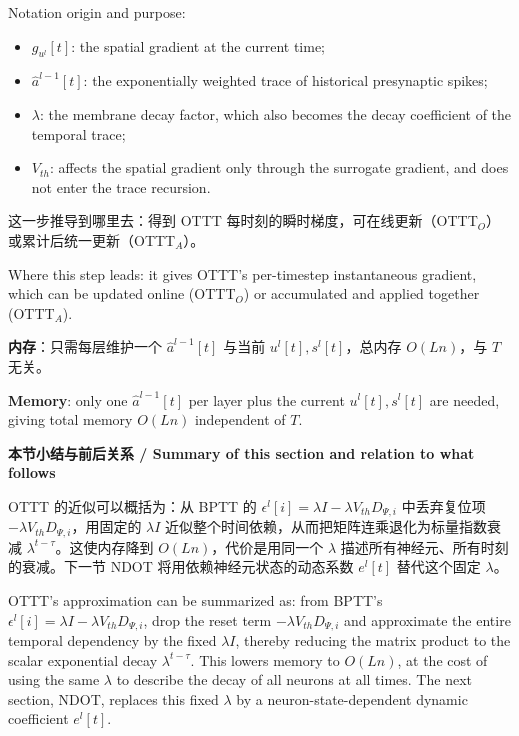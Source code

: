 \documentclass[journal,12pt,onecolumn]{IEEEtran}
\begin{document}
Notation origin and purpose:
\begin{itemize}[leftmargin=1.5em,itemsep=2pt]
\item $g_{u^l}[t]$: the spatial gradient at the current time;
\item $\hat{a}^{l-1}[t]$: the exponentially weighted trace of historical presynaptic spikes;
\item $\lambda$: the membrane decay factor, which also becomes the decay coefficient of the temporal trace;
\item $V_{th}$: affects the spatial gradient only through the surrogate gradient, and does not enter the trace recursion.
\end{itemize}

这一步推导到哪里去：得到 OTTT 每时刻的瞬时梯度，可在线更新（OTTT$_O$）或累计后统一更新（OTTT$_A$）。

Where this step leads: it gives OTTT's per-timestep instantaneous gradient, which can be updated online (OTTT$_O$) or accumulated and applied together (OTTT$_A$).

\textbf{内存}：只需每层维护一个 $\hat{a}^{l-1}[t]$ 与当前 $u^l[t],s^l[t]$，总内存 $O(Ln)$，与 $T$ 无关。

\textbf{Memory}: only one $\hat{a}^{l-1}[t]$ per layer plus the current $u^l[t],s^l[t]$ are needed, giving total memory $O(Ln)$ independent of $T$.

\medskip\noindent\textbf{本节小结与前后关系 / Summary of this section and relation to what follows}

OTTT 的近似可以概括为：从 BPTT 的 $\epsilon^l[i]=\lambda I-\lambda V_{th}D_{\Psi,i}$ 中丢弃复位项 $-\lambda V_{th}D_{\Psi,i}$，用固定的 $\lambda I$ 近似整个时间依赖，从而把矩阵连乘退化为标量指数衰减 $\lambda^{t-\tau}$。这使内存降到 $O(Ln)$，代价是用同一个 $\lambda$ 描述所有神经元、所有时刻的衰减。下一节 NDOT 将用依赖神经元状态的动态系数 $e^l[t]$ 替代这个固定 $\lambda$。

OTTT's approximation can be summarized as: from BPTT's $\epsilon^l[i]=\lambda I-\lambda V_{th}D_{\Psi,i}$, drop the reset term $-\lambda V_{th}D_{\Psi,i}$ and approximate the entire temporal dependency by the fixed $\lambda I$, thereby reducing the matrix product to the scalar exponential decay $\lambda^{t-\tau}$. This lowers memory to $O(Ln)$, at the cost of using the same $\lambda$ to describe the decay of all neurons at all times. The next section, NDOT, replaces this fixed $\lambda$ by a neuron-state-dependent dynamic coefficient $e^l[t]$.

\end{document}
